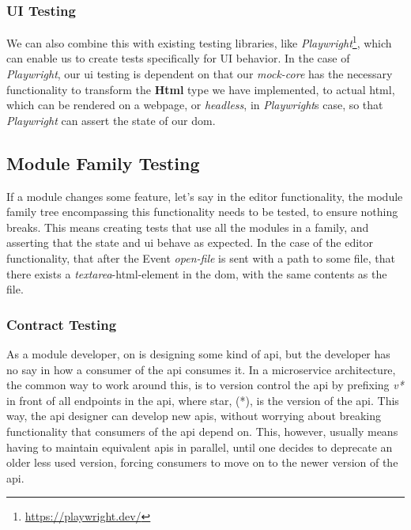 \subsubsection{UI Testing}

We can also combine this with existing testing libraries, like \textit{Playwright}\footnote{\url{https://playwright.dev/}},
which can enable us to create tests specifically for UI behavior. In the case of
\textit{Playwright}, our \gls*{ui} testing is dependent on that our
\textit{mock-core} has the necessary functionality to transform the
\textbf{Html} type we have implemented, to actual \gls*{html}, which can be
rendered on a webpage, or \textit{headless}, in \textit{Playwright}s case, so
that \textit{Playwright} can assert the state of our \gls*{dom}.

\subsection{Module Family Testing}

If a module changes some feature, let's say in the editor functionality, the
module family tree encompassing this functionality needs to be tested, to ensure
nothing breaks. This means creating tests that use all the modules in a family,
and asserting that the state and \gls*{ui} behave as expected. In the case of
the editor functionality, that after the Event \textit{open-file} is sent with
a path to some file, that there exists a \textit{textarea}-\gls*{html}-element in
the \gls*{dom}, with the same contents as the file.

\subsubsection{Contract Testing}

As a module developer, on is designing some kind of \gls*{api}, but the developer
has no say in how a consumer of the \gls*{api} consumes it. In a microservice
architecture, the common way to work around this, is to version control the
\gls*{api} by prefixing \textit{v*} in front of all endpoints in the \gls*{api},
where star, (*), is the version of the \gls*{api}. This way, the \gls*{api}
designer can develop new \gls*{api}s, without worrying about breaking
functionality that consumers of the \gls*{api} depend on. This, however, usually
means having to maintain equivalent \gls*{api}s in parallel, until one decides
to deprecate an older less used version, forcing consumers to move on to the
newer version of the \gls*{api}.

